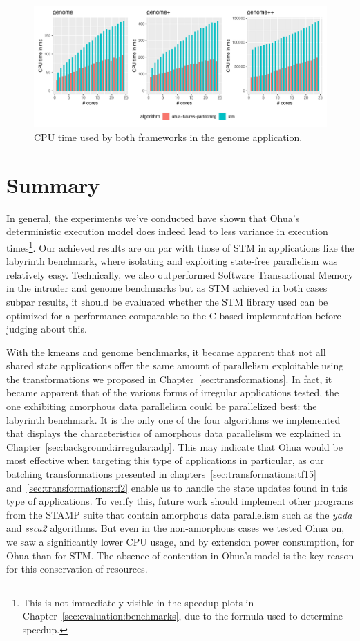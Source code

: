 \begin{figure}
    \centering
    \includegraphics[width=\textwidth,keepaspectratio]{gfx/results/cpu_genome_comb}
    \caption{CPU time used by both frameworks in the genome application.}%
    \label{fig:evaluation:genome-cpu}
\end{figure}


\section{Summary}%
\label{sec:evaluation:summary}

In general, the experiments we've conducted have shown that Ohua's deterministic execution model does indeed lead to less variance in execution times\footnote{This is not immediately visible in the speedup plots in Chapter~\ref{sec:evaluation:benchmarks}, due to the formula used to determine speedup.}.
Our achieved results are on par with those of STM in applications like the labyrinth benchmark, where isolating and exploiting state-free parallelism was relatively easy.
Technically, we also outperformed Software Transactional Memory in the intruder and genome benchmarks but as STM achieved in both cases subpar results, it should be evaluated whether the STM library used can be optimized for a performance comparable to the C-based implementation before judging about this.

With the kmeans and genome benchmarks, it became apparent that not all shared state applications offer the same amount of parallelism exploitable using the transformations we proposed in Chapter~\ref{sec:transformations}.
In fact, it became apparent that of the various forms of irregular applications tested, the one exhibiting amorphous data parallelism could be parallelized best: the labyrinth benchmark.
It is the only one of the four algorithms we implemented that displays the characteristics of amorphous data parallelism we explained in Chapter~\ref{sec:background:irregular:adp}.
This may indicate that Ohua would be most effective when targeting this type of applications in particular, as our batching transformations presented in chapters~\ref{sec:transformations:tf15} and~\ref{sec:transformations:tf2} enable us to handle the state updates found in this type of applications.
To verify this, future work should implement other programs from the STAMP suite that contain amorphous data parallelism such as the \emph{yada} and \emph{ssca2} algorithms.
But even in the non-amorphous cases we tested Ohua on, we saw a significantly lower CPU usage, and by extension power consumption, for Ohua than for STM.
The absence of contention in Ohua's model is the key reason for this conservation of resources.


